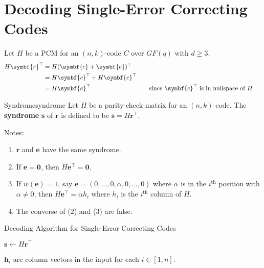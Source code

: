 \section{Decoding Single-Error Correcting Codes}
Let $ H $ be a PCM for an $ (n,k) $-code $ C $ over $ GF(q) $
with $ d\geqslant 3 $.
\begin{align*}
    H\symbf{r}^\top
     & =H(\symbf{c}+\symbf{e})^\top                                                                         \\
     & =H\symbf{c}^\top+H \symbf{e}^\top                                                                    \\
     & =H\symbf{e}^\top                  & \quad & \text{since $ \symbf{c}^\top $ is in nullspace of $ H$ }
\end{align*}

\begin{Definition}{Syndrome}{syndrome}
    Let $ H $ be a parity-check matrix for an $ (n,k) $-code.
    The \textbf{syndrome} $ \symbf{s} $ of $ \symbf{r} $
    is defined to be $ \symbf{s}=H\symbf{r}^\top $.
\end{Definition}

Notes:
\begin{enumerate}[label=(\arabic*)]
    \item $ \symbf{r} $ and $ \symbf{e} $ have the same syndrome.
    \item If $ \symbf{e}=\symbf{0} $, then $ H\symbf{e}^\top=\symbf{0} $.
    \item If $ w(\symbf{e})=1 $, say $ \symbf{e}=(0,\ldots,0,\alpha,0,\ldots,0) $
          where $ \alpha $ is in the $ i^{\text{th}} $ position with $ \alpha \neq 0 $,
          then $ H\symbf{e}^\top=\alpha h_i $ where $ h_i $ is the $ i^{\text{th}} $
          column of $ H $.
    \item The converse of (2) and (3) are false.
\end{enumerate}

\begin{algorithm}
    \DontPrintSemicolon{}
    \caption{Decoding Algorithm for Single-Error Correcting Codes}\label{alg:Decoding Algorithm for Single-Error Correcting Codes}

    $ \symbf{s}\gets H\symbf{r}^\top $\;
     {
    }
     {
         {
        }
    }
    \Return{}
\end{algorithm}
\begin{Remark}{}{}
    $ \symbf{h}_i $ are column vectors in the input for each $ i\in[1,n] $.
\end{Remark}

